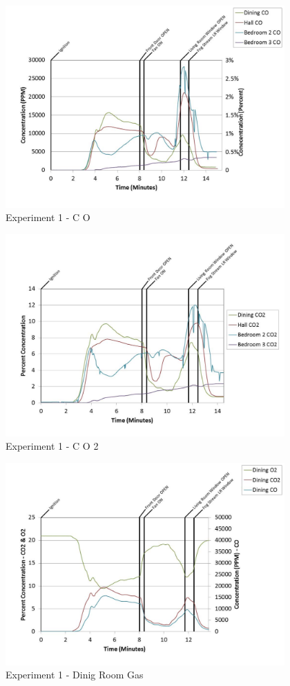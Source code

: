 \documentclass{article}
\begin{document}
\begin{appendices}
	\clearpage

	\begin{figure}[h!]
		\centering
		\includegraphics[height=3.05in]{0_Images/Results_Charts/Exp_1_Charts/CO.pdf}
		\caption{Experiment 1 - C O}
	\end{figure}
 

	\begin{figure}[h!]
		\centering
		\includegraphics[height=3.05in]{0_Images/Results_Charts/Exp_1_Charts/CO2.pdf}
		\caption{Experiment 1 - C O 2}
	\end{figure}
 
	\clearpage

	\begin{figure}[h!]
		\centering
		\includegraphics[height=3.05in]{0_Images/Results_Charts/Exp_1_Charts/DinigRoomGas.pdf}
		\caption{Experiment 1 - Dinig Room Gas}
	\end{figure}
 


\end{appendices}
\end{document}
